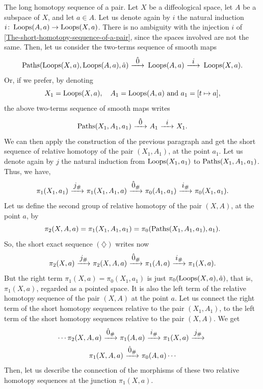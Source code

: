 \begin{Article}{The long homotopy sequence of a pair.}{}
  \label{The-long-homotopy-sequence-of-a-pair}
  Let $X$ be a diffeological space,
  let $A$ be a subspace of $X$,
  and let $a \in A$.
  Let us denote again by $i$ the natural induction $i \colon \operatorname{Loops}(A,a) \to  \operatorname{Loops}(X,a)$.
  There is no ambiguity with the injection $i$ of \textsection\,\ref{The-short-homotopy-sequence-of-a-pair},
  since the spaces involved are not the same.
  Then,
  let us consider the two-terms sequence of smooth maps
  $$%
  \Paths(\Loops(X,a),\Loops(A,a), \hat a) \rfl{\0} \Loops(A,a) \rfl{i} \Loops(X,a).
  $$%
  Or,
  if we prefer,
  by denoting
  $$%
  X_1 = \Loops(X,a), \quad A_1 = \Loops(A,a) \SpacedText{and} a_1 = [t \mapsto a],
  $$%
  the above two-terms sequence of smooth maps writes
  $$%
  \Paths(X_1,A_1, a_1) \rfl{\0} A_1 \rfl{i} X_1.
  $$%
  We can then apply the construction of the previous paragraph and get the short sequence of relative homotopy of the pair $(X_1,A_1)$,
  at the point $a_1$.
  Let us denote again by $j$ the natural induction from $\operatorname{Loops}(X_1,a_1)$ to $\operatorname{Paths}(X_1,A_1,a_1)$.
  Thus,
  we have,
  \begin{equation}
    \renewcommand{\theequation}{$\diamondsuit$}
    \pi_1(X_1,a_1) \rfl{j_\#}
    \pi_1(X_1,A_1,a) \rfl{\0_\#}
    \pi_0(A_1,a_1) \rfl{i_\#} \pi_0(X_1,a_1).
  \end{equation}
  Let us define the second group of relative homotopy of the
  pair $(X,A)$,
  at the point $a$,
  by
  $$%
  \pi_2(X,A,a) =
  \pi_1(X_1,A_1,a_1) =
  \pi_0(\Paths(X_1,A_1,a_1),a_1).
  $$%
  So,
  the short exact sequence $(\diamondsuit)$ writes now
  \begin{equation}
    \renewcommand{\theequation}{$\heartsuit$}
    \pi_2(X,a) \rfl{j_\#}
    \pi_2(X,A,a) \rfl{\0_\#}
    \pi_1(A,a) \rfl{i_\#} \pi_1(X,a).
  \end{equation}
  But the right term $\pi_1(X,a) \!=\! \pi_0(X_1,a_1)$ is just $\pi_0(\operatorname{Loops}(X,a),\hat a)$,
  that is,
  $\pi_1(X,a)$,
  regarded as a pointed space.
  It is also the left term of the relative homotopy sequence of the pair $(X,A)$ at the point $a$.
  Let us connect the right term of the short homotopy sequences relative to the pair $(X_1,A_1)$,
  to the left term of the short homotopy sequences relative to the pair $(X,A)$.
  We get
  \begin{multline*}
  \cdots
  \pi_2(X,A,a) \rfl{\0_\#}
  \pi_1(A,a) \rfl{i_\#}
  \pi_1(X,a) \rfl{j_\#} \\
  \pi_1(X,A,a) \rfl{\0_\#}
  \pi_0(A,a) \cdots
  \end{multline*}
  Then,
  let us describe the connection of the morphisms of these two relative homotopy sequences at the junction $\pi_1(X,a)$.


\end{Article}
